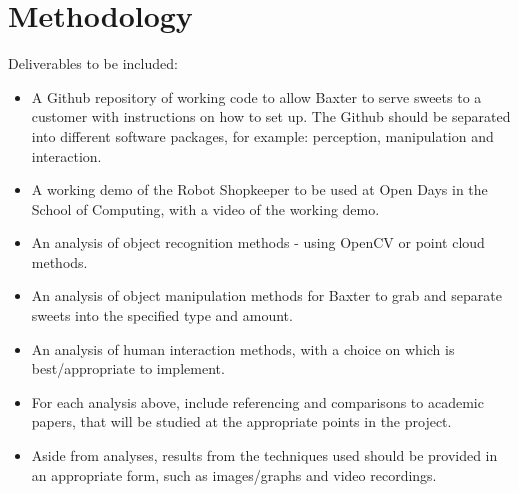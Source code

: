 \section{Methodology}
Deliverables to be included:
\begin{itemize}
	\item{A Github repository of working code to allow Baxter to serve sweets to a customer with instructions on how to set up. The Github should be separated into different software packages, for example: perception, manipulation and interaction.}
	\item{A working demo of the Robot Shopkeeper to be used at Open Days in the School of Computing, with a video of the working demo.}
	\item{An analysis of object recognition methods - using OpenCV or point cloud methods.}
	\item{An analysis of object manipulation methods for Baxter to grab and separate sweets into the specified type and amount.}
	\item{An analysis of human interaction methods, with a choice on which is best/appropriate to implement.}
	\item{For each analysis above, include referencing and comparisons to academic papers, that will be studied at the appropriate points in the project.}
	\item{Aside from analyses, results from the techniques used should be provided in an appropriate form, such as images/graphs and video recordings.}
\end{itemize}
